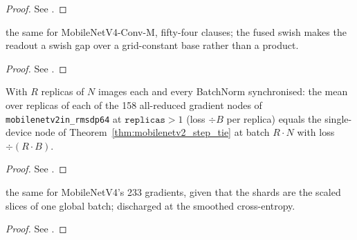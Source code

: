 \begin{proof}
\leanok
See .
\end{proof}

\begin{theorem}
  \label{thm:mobilenetv4_seal}
  \leanok
  \Prove{} the same for MobileNetV4-Conv-M, fifty-four clauses; the fused
  swish makes the readout a swish gap over a grid-constant base rather than a
  product.
\end{theorem}

\begin{proof}
\leanok
See .
\end{proof}

\begin{theorem}
  \label{thm:mobilenetv2_sync_tie}
  \leanok
  With \(R\) replicas of \(N\) images each and every BatchNorm synchronised:
  \Prove{} the mean over replicas of each of the 158 all-reduced gradient nodes
  of \texttt{mobilenetv2in\_rmsdp64} at \(\texttt{replicas} > 1\) (loss
  \(\div B\) per replica) equals the single-device node of
  Theorem~\ref{thm:mobilenetv2_step_tie} at batch \(R \cdot N\) with loss
  \(\div (R \cdot B)\).
\end{theorem}

\begin{proof}
\leanok
See .
\end{proof}

\begin{theorem}
  \label{thm:mobilenetv4_sync_tie}
  \leanok
  \Prove{} the same for MobileNetV4's 233 gradients, given that the shards
  are the scaled slices of one global batch; discharged at the smoothed
  cross-entropy.
\end{theorem}

\begin{proof}
\leanok
See .
\end{proof}

